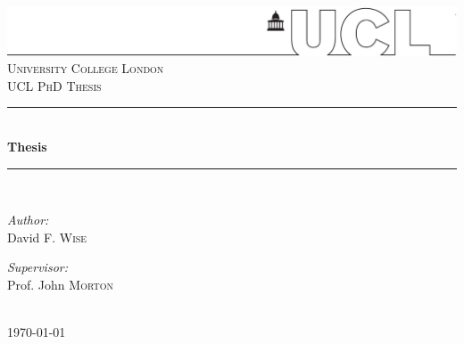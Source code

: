\begin{titlepage}
\vspace*{-1in}\hspace*{-1.5in}\includegraphics[width=1.02\paperwidth]{UCLlogo}
\newcommand{\HRule}{\rule{\linewidth}{0.5mm}} %
\null\vfil
\center %
 \textsc{\LARGE University College London}
\\[1cm]
\textsc{\Large UCL PhD Thesis}\\[0.5cm] %


\HRule \\[0.2cm]
{\LARGE \bfseries Thesis}\\[-0.2cm]
\HRule \\[1.2cm]

\begin{minipage}[t]{0.4\textwidth}
\begin{flushleft} \large
\emph{Author:}\\
David F. \textsc{Wise}%
\end{flushleft}
\end{minipage}
\begin{minipage}[t]{0.4\textwidth}
\begin{flushright} \large
\emph{Supervisor:} \\
Prof. John \textsc{Morton} \\%
\end{flushright}
\end{minipage}\\[2cm]

{\large \today}\\%


\null\vfil %
\end{titlepage}

